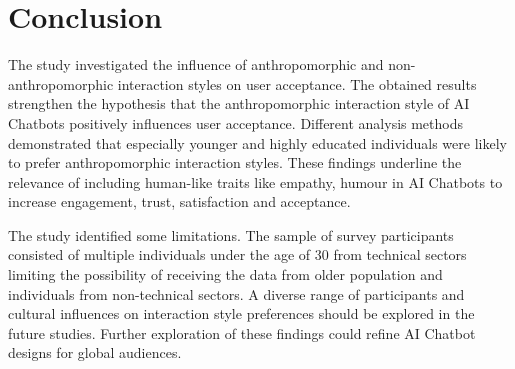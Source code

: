 \documentclass[conference]{IEEEtran}
\begin{document}
\section{Conclusion}
The study investigated the influence of anthropomorphic and non-anthropomorphic interaction styles on user acceptance. The obtained results strengthen the hypothesis that the anthropomorphic interaction style of AI Chatbots positively influences user acceptance. Different analysis methods demonstrated that especially younger and highly educated individuals were likely to prefer anthropomorphic interaction styles. These findings underline the relevance of including human-like traits like empathy, humour in AI Chatbots to increase engagement, trust, satisfaction and acceptance. \par
The study identified some limitations. The sample of survey participants consisted of multiple individuals under the age of 30 from technical sectors limiting the possibility of receiving the data from older population and individuals from non-technical sectors. A diverse range of participants and cultural influences on interaction style preferences should be explored in the future studies. Further exploration of these findings could refine AI Chatbot designs for global audiences.  
\end{document}
